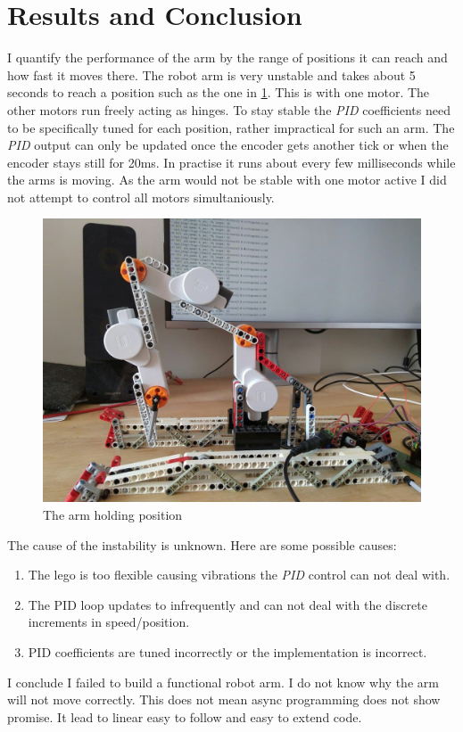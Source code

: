 \documentclass[lang=en, hanging-titles=true]{skrapport}
\begin{document}
\section{Results and Conclusion}
\label{sec:results}
I quantify the performance of the arm by the range of positions it can reach and how fast it moves there. The robot arm is very unstable and takes about 5 seconds to reach a position such as the one in \cref{fig:pos}. This is with one motor. The other motors run freely acting as hinges. To stay stable the \textit{PID} coefficients need to be specifically tuned for each position, rather impractical for such an arm. The \textit{PID} output can only be updated once the encoder gets another tick or when the encoder stays still for 20ms. In practise it runs about every few milliseconds while the arms is moving. As the arm would not be stable with one motor active I did not attempt to control all motors simultaniously.
%
\begin{figure}
	\centering
	\includegraphics[width=0.8\linewidth]{figs/arm}
	\caption{The arm holding position}
	\label{fig:pos}
\end{figure}
%

The cause of the instability is unknown. Here are some possible causes: 
\begin{enumerate}
	\item The lego is too flexible causing vibrations the \textit{PID} control can not deal with. 
	\item The PID loop updates to infrequently and can not deal with the discrete increments in speed/position.
	\item PID coefficients are tuned incorrectly or the implementation is incorrect.
\end{enumerate}
%
I conclude I failed to build a functional robot arm. I do not know why the arm will not move correctly. This does not mean async programming does not show promise. It lead to linear easy to follow and easy to extend code.
\end{document}
